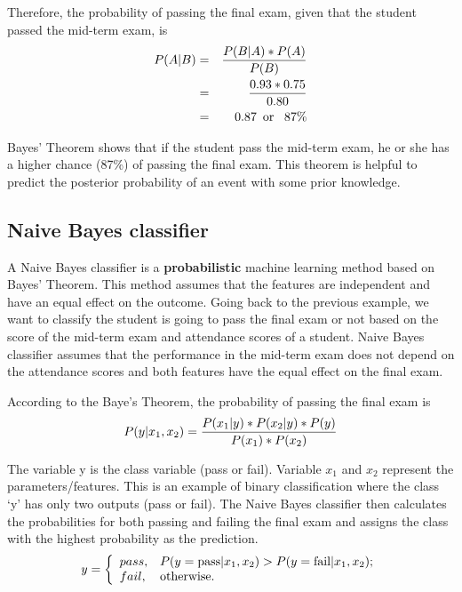 Therefore, the probability of passing the final exam, given that the student passed the mid-term exam, is
\begin{eqnarray}
  P(A | B) &=& \frac{P(B | A) * P(A)} {P(B)} \\
           &=& \frac{0.93 * 0.75}{0.80}\\
           &=& 0.87  \text{\hspace{5pt}or \hspace{5pt}} 87\%
\end{eqnarray}

Bayes' Theorem shows that if the student pass the mid-term exam, he or she has a higher chance (87\%) of passing the final exam. This theorem is helpful to predict the posterior probability of an event with some prior knowledge.

\newpage
\subsection{Naive Bayes classifier}
A Naive Bayes classifier is a \textbf{probabilistic} machine learning method based on Bayes' Theorem. This method assumes that the features are independent and have an equal effect on the outcome. Going back to the previous example, we want to classify the student is going to pass the final exam or not based on the score of the mid-term exam and attendance scores of a student. Naive Bayes classifier assumes that the performance in the mid-term exam does not depend on the attendance scores and both features have the equal effect on the final exam.

According to the Baye's Theorem, the probability of passing the final exam is
\begin{equation}\label{eqn:NBclassifier}
  P(y | x_1, x_2) = \frac{P(x_1 | y) * P(x_2|y) * P(y)} {P(x_1)*P(x_2)} \\
\end{equation}


The variable y is the class variable (pass or fail). Variable $x_1$ and $x_2$ represent the parameters/features. This is an example of binary classification where the class `y' has only two outputs (pass or fail). The Naive Bayes classifier then calculates the probabilities for both passing and failing the final exam and assigns the class with the highest probability as the prediction.
\begin{equation}\label{eqn:NBbinary}
  y = \left\{
        \begin{array}{ll}
          pass, & \hbox{$P(y= \text{pass} | x_1, x_2)> P(y= \text{fail} | x_1, x_2)$;} \\
          fail, & \hbox{otherwise.}
        \end{array}
      \right.
\end{equation}


